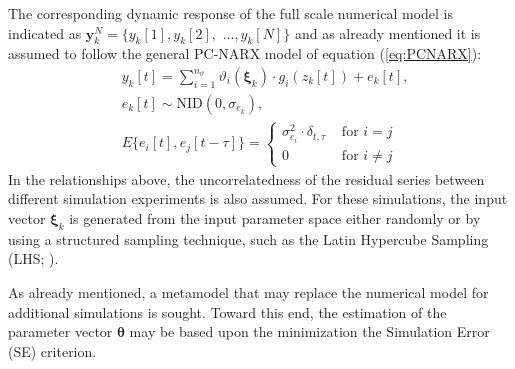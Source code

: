 \documentclass[preprint,3p,review,times,11pt]{elsarticle}
\newcommand{\bld}[1]{\boldsymbol{#1}}
\newcommand{\bth}{\bld{\theta}}
\newcommand{\bxi}{\bld{\xi}}
\begin{document}
The corresponding dynamic response of the full scale numerical model is indicated as ${\bld y}_k^N = \{ y_k[1], y_k[2],$ $\ldots, y_k[N] \}$ and as already mentioned it is assumed to follow the general PC-NARX model of equation (\ref{eq:PCNARX}):
\begin{subequations} \label{eq:assumptions}
\begin{align} & y_k[t] = \sum_{i=1}^{n_\vartheta} \vartheta_i(\bxi_k) \cdot g_i(z_k[t]) + e_k[t], \label{eq:exp_n} \\  
& e_k[t] \sim  \mbox{NID}(0,\sigma_{e_k}), \\ 
& E\{ e_i [t], e_j[ t - \tau ] \} =  
\begin{cases} 
\sigma^2_{e_i} \cdot \delta_{t,\tau} & \mbox{ for } i = j \\
 0 &  \mbox{ for } i \neq j \end{cases}
\end{align}
\end{subequations}
In the relationships above, the uncorrelatedness of the residual series between different simulation experiments is also assumed. For these simulations, the input vector $\bxi_k$ is generated from the input parameter space either randomly or by using a structured sampling technique, such as the Latin Hypercube Sampling (LHS; \cite{Helton-Davis2003}).

As already mentioned, a metamodel that may replace the numerical model for additional simulations is sought. Toward this end, the estimation of the parameter vector $\bth$ may be based upon the minimization the Simulation Error (SE) criterion. 


\end{document}
